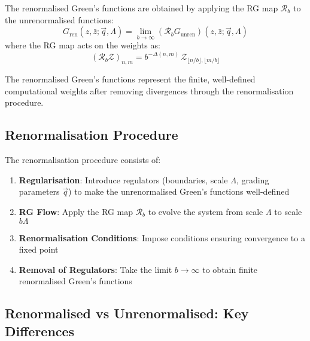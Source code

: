 \begin{definition}
\label{def:renormalised-greens}
The renormalised Green's functions are obtained by applying the RG map $\mathcal{R}_b$ to the unrenormalised functions:
\[
G_{\text{ren}}(z, \bar{z}; \vec{q}, \Lambda) = \lim_{b \to \infty} (\mathcal{R}_b G_{\text{unren}})(z, \bar{z}; \vec{q}, \Lambda)
\]
where the RG map acts on the weights as:
\[
(\mathcal{R}_b\mathcal{Z})_{n,m} = b^{-\Delta(n,m)}\,\mathcal{Z}_{\lfloor n/b\rfloor,\lfloor m/b\rfloor}
\]
\end{definition}

The renormalised Green's functions represent the finite, well-defined computational weights after removing divergences through the renormalisation procedure.

\subsection{Renormalisation Procedure}

\begin{definition}
\label{def:renormalisation-procedure}
The renormalisation procedure consists of:
\begin{enumerate}
\item \textbf{Regularisation}: Introduce regulators (boundaries, scale $\Lambda$, grading parameters $\vec q$) to make the unrenormalised Green's functions well-defined
\item \textbf{RG Flow}: Apply the RG map $\mathcal{R}_b$ to evolve the system from scale $\Lambda$ to scale $b\Lambda$
\item \textbf{Renormalisation Conditions}: Impose conditions ensuring convergence to a fixed point
\item \textbf{Removal of Regulators}: Take the limit $b \to \infty$ to obtain finite renormalised Green's functions
\end{enumerate}
\end{definition}

\subsection{Renormalised vs Unrenormalised: Key Differences}

